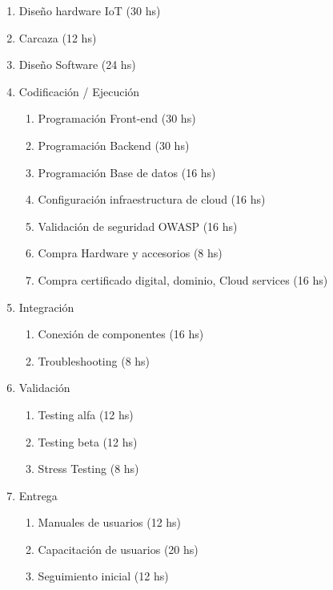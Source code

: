 \documentclass[11pt]{charter}
\begin{document}
\begin{consigna}
\begin{enumerate}
        \begin{enumerate}
        \item Diseño hardware IoT (30 hs)
        \item Carcaza  (12 hs)
        \item Diseño Software (24 hs)
        
\item Codificación / Ejecución

        \begin{enumerate}
        \item Programación Front-end (30 hs)
        \item Programación Backend (30 hs)
        \item Programación Base de datos (16 hs)
        \item Configuración infraestructura de cloud (16 hs)
        \item Validación de seguridad OWASP (16 hs)
        \item Compra Hardware y accesorios (8 hs)
        \item Compra certificado digital, dominio, Cloud services (16 hs)
        \end{enumerate}

\item Integración

        \begin{enumerate}
        \item Conexión de componentes (16 hs)
        \item Troubleshooting (8 hs)
        \end{enumerate}

\item Validación

        \begin{enumerate}
        \item Testing alfa (12 hs)
        \item Testing beta (12 hs)
        \item Stress Testing (8 hs)
        \end{enumerate}

\item Entrega

        \begin{enumerate}
        \item Manuales de usuarios (12 hs)
        \item Capacitación de usuarios (20 hs)
        \item Seguimiento inicial (12 hs)
        \end{enumerate}


\end{enumerate}
\end{enumerate}
\end{consigna}
\end{document}

